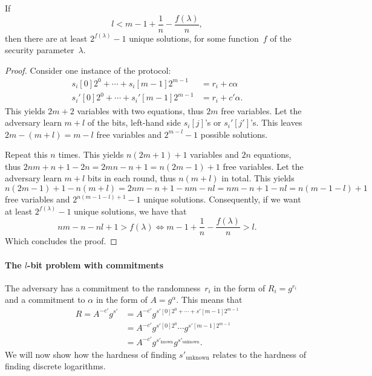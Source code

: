 \begin{lemma}\label{l-bit-advantage}
  If \[l < m-1+\frac{1}{n}-\frac{f(\lambda)}{n},\] then there are at least 
  \(2^{f(\lambda)}-1\) unique solutions, for some function~\(f\) of the 
  security parameter~\(\lambda\).
\end{lemma}
\begin{proof}
  Consider one instance of the protocol:
  \begin{align*}
    s_i[0]2^0 + \dotsb + s_i[m-1]2^{m-1} &= r_i + c\alpha \\
    s_i'[0]2^0 + \dotsb + s_i'[m-1]2^{m-1} &= r_i + c'\alpha.
  \end{align*}
  This yields \(2m+2\) variables with two equations, thus \(2m\) free variables.
  Let the adversary learn \(m+l\) of the bits, \ie left-hand side \(s_i[j]\)'s or 
  \(s_i'[j']\)'s.
  This leaves \(2m-(m+l) = m-l\) free variables and \(2^{m-l}-1\) possible 
  solutions.

  Repeat this \(n\) times.
  This yields \(n(2m+1)+1\) variables and \(2n\) equations, thus \(2nm+n+1-2n = 
  2mn - n +1 = n(2m-1)+1\) free variables.
  Let the adversary learn \(m+l\) bits in each round, thus \(n(m+l)\) in total.
  This yields \(n(2m-1)+1 -n(m+l) = 2nm-n+1-nm-nl = nm-n+1-nl = n(m-1-l)+1\) 
  free variables and \(2^{n(m-1-l)+1}-1\) unique solutions.
  Consequently, if we want at least \(2^{f(\lambda)}-1\) unique solutions, we 
  have that
  \begin{equation*}
    nm-n-nl+1 > f(\lambda) \iff m-1+\frac{1}{n}-\frac{f(\lambda)}{n} > l.
  \end{equation*}
  Which concludes the proof.
\end{proof}

\paragraph*{The \(l\)-bit problem with commitments}

The adversary has a commitment to the randomness~\(r_i\) in the form of \(R_i = 
g^{r_i}\) and a commitment to \(\alpha\) in the form of \(A = g^\alpha\).
This means that
\begin{align*}
  R = A^{-c'} g^{s'} &= A^{-c'} g^{s'[0] 2^0 + \dotsb + s'[m-1] 2^{m-1}} \\
                     &= A^{-c'} g^{s'[0] 2^0} \dotsb g^{s'[m-1] 2^{m-1}} \\
                     &= A^{-c'} g^{s'_{\text{known}}} g^{s'_{\text{unknown}}}.
\end{align*}
We will now show how the hardness of finding \(s'_{\text{unknown}}\) relates to 
the hardness of finding discrete logarithms.

